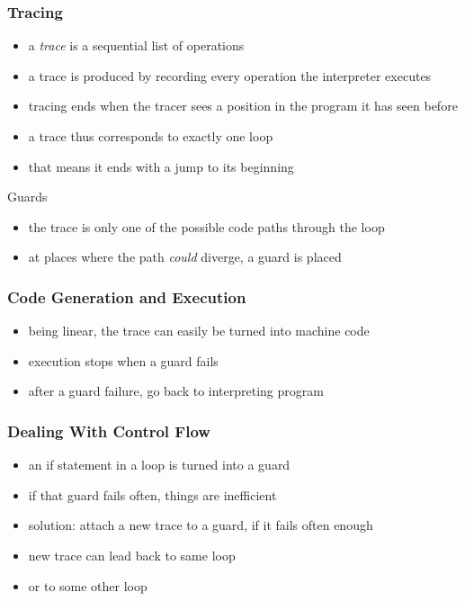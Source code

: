\documentclass[utf8x]{beamer}
\begin{document}
\begin{frame}
    \frametitle{Tracing}
    \begin{itemize}
    \item a \emph{trace} is a sequential list of operations
    \item a trace is produced by recording every operation the interpreter executes
    \item tracing ends when the tracer sees a position in the program it has seen before
    \item a trace thus corresponds to exactly one loop
    \item that means it ends with a jump to its beginning
    \end{itemize}
    \pause
    \begin{block}{Guards}
        \begin{itemize}
        \item the trace is only one of the possible code paths through the loop
        \item at places where the path \emph{could} diverge, a guard is placed
        \end{itemize}
    \end{block}
\end{frame}

\begin{frame}
    \frametitle{Code Generation and Execution}
    \begin{itemize}
    \item being linear, the trace can easily be turned into machine code
    \item execution stops when a guard fails
    \item after a guard failure, go back to interpreting program
    \end{itemize}
\end{frame}

\begin{frame}
  \frametitle{Dealing With Control Flow}
  \begin{itemize}
      \item an if statement in a loop is turned into a guard
      \item if that guard fails often, things are inefficient
      \item solution: attach a new trace to a guard, if it fails often enough
      \item new trace can lead back to same loop
      \item or to some other loop
  \end{itemize}
\end{frame}
\end{document}
